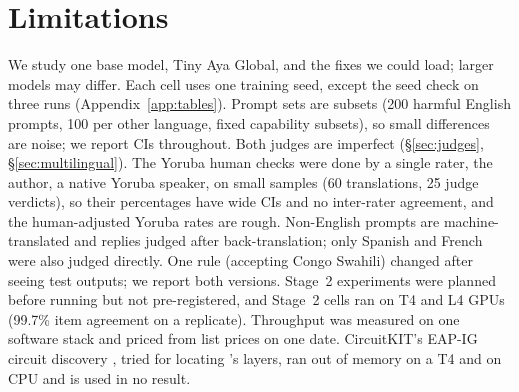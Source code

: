 \section*{Limitations}
We study one base model, Tiny Aya Global, and the fixes we could load; larger models may differ. Each
cell uses one training seed, except the seed check on three runs (Appendix~\ref{app:tables}). Prompt sets are
subsets (200 harmful English prompts, 100 per other language, fixed capability subsets), so small differences are
noise; we report CIs throughout. Both judges are imperfect (\S\ref{sec:judges}, \S\ref{sec:multilingual}). The Yoruba human checks were done by a single rater, the author, a native Yoruba speaker, on small samples (60 translations,
25 judge verdicts), so their percentages have wide CIs and no inter-rater agreement, and the human-adjusted Yoruba rates
are rough. Non-English prompts are machine-translated and replies judged after back-translation; only Spanish and
French were also judged directly. One rule (accepting Congo Swahili) changed after seeing test outputs; we report
both versions. Stage~2 experiments were planned before running but not pre-registered, and Stage~2 cells ran on T4
and L4 GPUs (99.7\% item agreement on a replicate). Throughput was measured on one software stack and priced from
list prices on one date. CircuitKIT's EAP-IG circuit discovery \citep{circuitkit2026}, tried for locating 's layers, ran out of memory on a T4 and on CPU and is used in no result.
